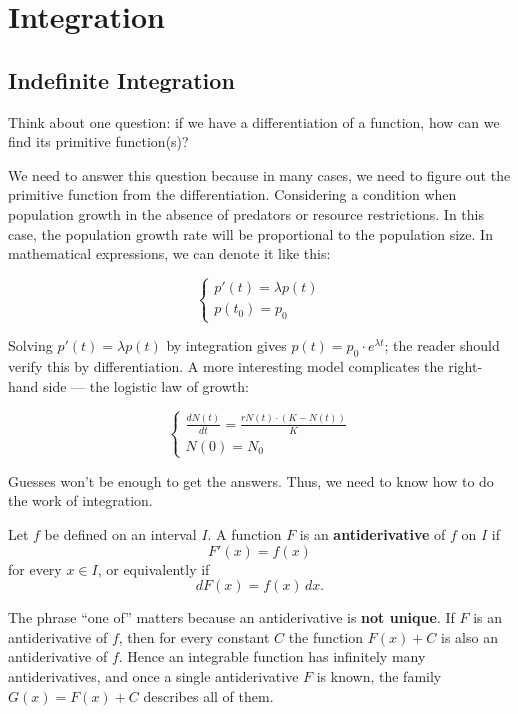 \section{Integration}

\subsection{Indefinite Integration}
Think about one question: if we have a differentiation of a function, how can we find its primitive function(s)?

We need to answer this question because in many cases, we need to figure out the primitive function from the differentiation. Considering a condition when population growth in the absence of predators or resource restrictions. In this case, the population growth rate will be proportional to the population size. In mathematical expressions, we can denote it like this:

\[
\begin{cases}
    p'(t) = \lambda p(t) \\
    p(t_0) = p_0
\end{cases}
\]

Solving $p'(t) = \lambda p(t)$ by integration gives $p(t)=p_0 \cdot e^{\lambda t}$; the reader should verify this by differentiation. A more interesting model complicates the right-hand side — the logistic law of growth:

\[
\begin{cases}
    \frac{dN(t)}{dt} = \frac{rN(t) \cdot (K-N(t))}{K} \\
    N(0) = N_0
\end{cases}
\]

Guesses won't be enough to get the answers. Thus, we need to know how to do the work of integration.

\begin{definition}[Antiderivative]
Let $f$ be defined on an interval $I$. A function $F$ is an \textbf{antiderivative} of $f$ on $I$ if
\[F'(x)=f(x)\]
for every $x\in I$, or equivalently if
\[dF(x)=f(x)\,dx.\]
\end{definition}

The phrase ``one of'' matters because an antiderivative is \textbf{not unique}. If $F$ is an antiderivative of $f$, then for every constant $C$ the function $F(x)+C$ is also an antiderivative of $f$. Hence an integrable function has infinitely many antiderivatives, and once a single antiderivative $F$ is known, the family $G(x)=F(x)+C$ describes all of them.

